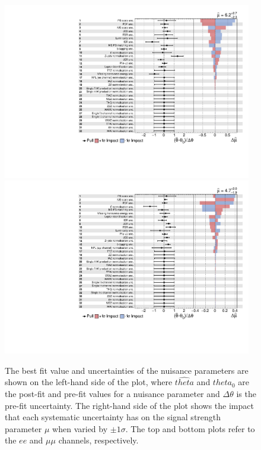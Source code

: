 \begin{figure}[htbp]
\begin{center}
\includegraphics[width=0.97\textwidth]{figs/results/systematicsImpact_ee.pdf}
\\
\includegraphics[width=0.97\textwidth]{figs/results/systematicsImpact_mumu.pdf}
\caption{The best fit value and uncertainties of the nuisance parameters are shown on the left-hand side of the plot, where $\widehat{theta}$ and $theta_{0}$ are the post-fit and pre-fit values for a nuisance parameter and $\Delta \theta$ is the pre-fit uncertainty.
The right-hand side of the plot shows the impact that each systematic uncertainty has on the signal strength parameter $\mu$ when varied by $\pm 1 \sigma$.
The top and bottom plots refer to the $ee$ and $\mu\mu$ channels, respectively.}
\label{fig:systematicsPull}
\end{center}
\end{figure}

